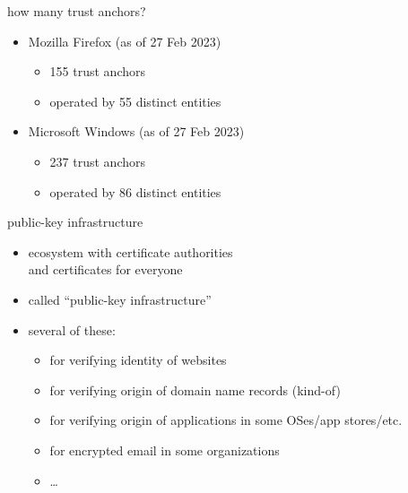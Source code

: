 \begin{frame}{how many trust anchors?}
    \begin{itemize}
    \item Mozilla Firefox (as of 27 Feb 2023)
        \begin{itemize}
            \item 155 trust anchors
            \item operated by 55 distinct entities
        \end{itemize}
    \item Microsoft Windows (as of 27 Feb 2023)
        \begin{itemize}
            \item 237 trust anchors
            \item operated by 86 distinct entities
        \end{itemize}
    \end{itemize}
\end{frame}

\begin{frame}{public-key infrastructure}
    \begin{itemize}
    \item ecosystem with certificate authorities \\
        and certificates for everyone
    \item called ``public-key infrastructure''
        \vspace{.5cm}
    \item several of these:
        \begin{itemize}
        \item for verifying identity of websites 
        \item for verifying origin of domain name records (kind-of)
        \item for verifying origin of applications in some OSes/app stores/etc.
        \item for encrypted email in some organizations
        \item \ldots
        \end{itemize}
    \end{itemize}
\end{frame}
